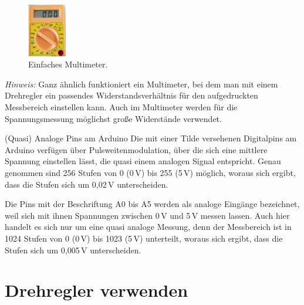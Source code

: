 \bigskip
\begin{figure}
	\centering
	\includegraphics[width=0.15\textwidth]{./pics/multimeter.jpg}
	\caption{Einfaches Multimeter.}
	\vspace{-5\baselineskip}
\end{figure}
\emph{Hinweis:} Ganz ähnlich funktioniert ein Multimeter, bei dem man mit einem Drehregler ein passendes Widerstandsverhältnis für den aufgedruckten Messbereich einstellen kann. Auch im Multimeter werden für die Spannungsmessung möglichst große Widerstände verwendet.

\vspace{4\baselineskip}

\begin{zsfg}{(Quasi) Analoge Pins am Arduino}
	Die mit einer Tilde versehenen Digitalpins am Arduino verfügen über Pulsweitenmodulation, über die sich eine mittlere Spannung einstellen lässt, die quasi einem analogen Signal entspricht. Genau genommen sind 256 Stufen von 0 (0\,V) bis 255 (5\,V) möglich, woraus sich ergibt, dass die Stufen sich um 0,02\,V unterscheiden.
	
	Die Pins mit der Beschriftung A0 bis A5 werden als analoge Eingänge bezeichnet, weil sich mit ihnen Spannungen zwischen 0\,V und 5\,V messen lassen. Auch hier handelt es sich nur um eine quasi analoge Messung, denn der Messbereich ist in 1024 Stufen von 0 (0\,V) bis 1023 (5\,V) unterteilt, woraus sich ergibt, dass die Stufen sich um 0,005\,V unterscheiden.
\end{zsfg}

\newpage
\section{Drehregler verwenden}
\label{sec:poti}

